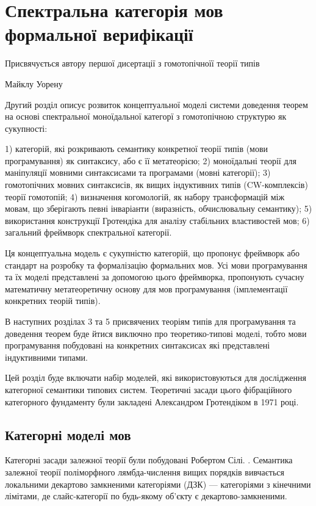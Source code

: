 
\chapter{Спектральна категорія мов формальної верифікації}
\epigraph{Присвячується автору першої дисертації з гомотопічноїї теорії типів}{Майклу Уорену}

Другий розділ описує розвиток концептуальної моделі системи доведення теорем на
основі спектральної моноїдальної категорї з гомотопічною структурю як сукупності:

1) категорій, які розкривають семантику конкретної теорії типів (мови програмування) як синтаксису, або є її метатеорією;
2) моноїдальні теорії для маніпуляції мовними синтаксисами та програмами (мовні категорії);
3) гомотопічних мовних синтаксисів, як вищих індуктивних типів (CW-комплексів) теорії гомотопій;
4) визначення когомологій, як набору трансформацій між мовам, що зберігають певні інваріанти (виразність, обчислювальну семантику);
5) використання конструкції Гротендіка для аналізу стабільних властивостей мов;
6) загальний фреймворк спектральної категорії.

Ця концептуальна модель є сукупністю категорій, що пропонує фреймворк або стандарт
на розробку та формалізацію формальних мов. Усі мови програмування та їх моделі представлені
за допомогою цього фреймворка, пропонують сучасну математичну метатеоретичну основу для
мов програмування (імплементації конкретних теорій типів).

В наступних розділах 3 та 5 присвячених теоріям типів для програмування та доведення теорем
буде йтися виключно про теоретико-типові моделі, тобто мови програмування побудовані
на конкретних синтаксисах які представлені індуктивними типами.

Цей розділ буде включати набір моделей, які використовуються для дослідження категорної семантики типових систем.
Теоретичні засади цього фібраційного категорного фундаменту були закладені Александром Гротендіком в 1971 році.

\section{Категорні моделі мов}
Категорні засади залежної теорії були побудовані Робертом Сілі. \cite{Seely84}.
Семантика залежної теорії поліморфного лямбда-числення вищих порядків
вивчається локальними декартово замкненими категоріями (ДЗК) --- категоріями з кінечними лімітами,
де слайс-категорії по будь-якому об'єкту є декартово-замкненими.

